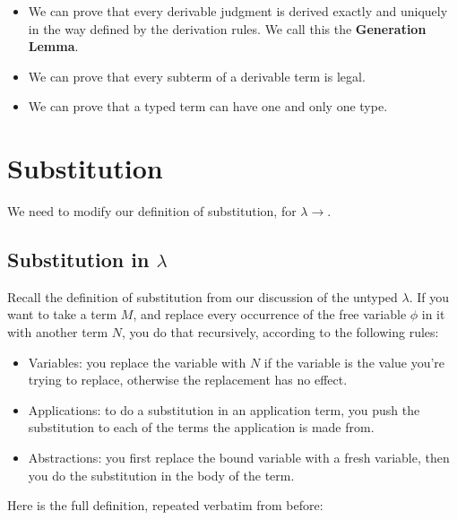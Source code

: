 \documentclass{book}
\numberwithin{equation}{chapter}
\newcommand{\vocab}{\textbf}
\begin{document}
\begin{itemize}
\item{We can prove that every derivable judgment is derived exactly and uniquely in the way defined by the derivation rules. We call this the \vocab{Generation Lemma}.}
\item{We can prove that every subterm of a derivable term is legal.}
\item{We can prove that a typed term can have one and only one type.}
\end{itemize}


\chapter{Substitution}

We need to modify our definition of substitution, for $\lambda\rightarrow$.


\section{Substitution in $\lambda$}

Recall the definition of substitution from our discussion of the untyped $\lambda$. If you want to take a term $M$, and replace every occurrence of the free variable $\phi$ in it with another term $N$, you do that recursively, according to the following rules:

\begin{itemize}
\item{Variables: you replace the variable with $N$ if the variable is the value you're trying to replace, otherwise the replacement has no effect.}
\item{Applications: to do a substitution in an application term, you push the substitution to each of the terms the application is made from.}
\item{Abstractions: you first replace the bound variable with a fresh variable, then you do the substitution in the body of the term.}
\end{itemize}

\noindent
Here is the full definition, repeated verbatim from before:
\end{document}
